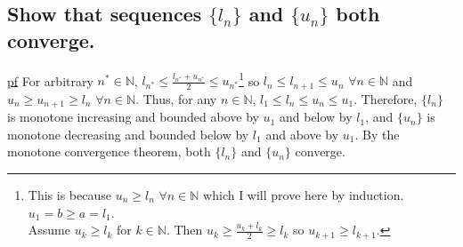 \documentclass[11pt]{article} %
\begin{document}
\subsection{Show that sequences $\{ l_n \}$ and $\{ u_n \}$  both converge.}
\underline{pf} For arbitrary $n^* \in \mathbb{N}$, $l_{n^*} \leq \frac{l_{n^*} +u_{n^*}}{2} \leq u_{n^*}$\footnote{This is because $u_n \geq l_n$ $\forall n \in \mathbb{N} $ which I will prove here by induction. \\ $u_1 = b \geq a = l_1$. \\ Assume $u_k \geq l_k $ for $k \in \mathbb{N}.$ Then $u_k \geq \frac{u_k + l_k}{2} \geq l_k $ so $u_{k+1} \geq l_{k+1}$. } so $l_n \leq l_{n+1} \leq u_n$ $\forall n \in \mathbb{N}$ and $u_n \geq u_{n+1} \geq l_n$ $\forall n \in \mathbb{N}$. Thus, for any $n \in \mathbb{N}$, $l_1 \leq l_n \leq u_n \leq u_1$. Therefore, $\{ l_n \}$ is monotone increasing and bounded above by $u_1$ and below by $l_1$, and $\{ u_n \}$ is monotone decreasing and bounded below by $l_1$ and above by $u_1$. By the monotone convergence theorem, both $\{ l_n \}$ and $\{ u_n \}$ converge.
\end{document}
